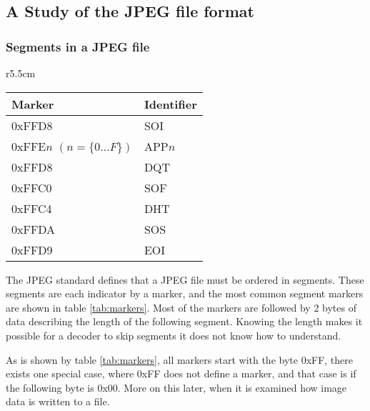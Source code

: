 \begin{infobox}{\section[A Study of the JPEG file format]{A Study of the JPEG file format}}
\subsubsection*{Segments in a JPEG file}
\begin{wraptable}{r}{5.5cm}
\caption{Most commonly used markers in JPEG files}
\label{tab:markers}
\begin{tabular}{|p{2.7cm}|l|}
\hline
Marker & Identifier\\ \hline
0xFFD8 & SOI\\ \hline
0xFFE$n$ \newline$(n = \{0 \ldots F\})$ & APP$n$\\ \hline
0xFFD8 & DQT \\ \hline
0xFFC0 & SOF \\ \hline
0xFFC4 & DHT\\ \hline
0xFFDA & SOS\\ \hline
0xFFD9 & EOI\\ \hline 
\end{tabular}
\end{wraptable}

The JPEG standard defines that a JPEG file must be ordered in segments. These segments are each indicator by a marker, and the most common segment markers are shown in table \ref{tab:markers}. Most of the markers are followed by 2 bytes of data describing the length of the following segment. Knowing the length makes it possible for a decoder to skip segments it does not know how to understand. 

As is shown by table \ref{tab:markers}, all markers start with the byte 0xFF, there exists one special case, where 0xFF does not define a marker, and that case is if the following byte is 0x00. More on this later, when it is examined how image data is written to a file.


\end{infobox}
